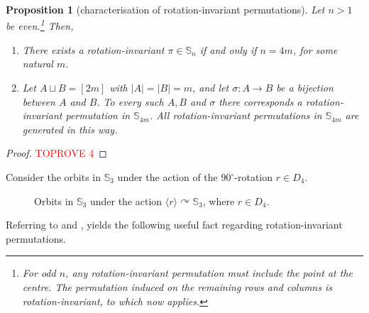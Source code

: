 \documentclass{article}
\newtheorem{proposition}[theorem]{Proposition}
\newcommand{\Sn}{\mathbb{S}_n}
\theoremstyle{remark}
\def\acts{\curvearrowright}
\theoremstyle{plain}
\begin{document}
\begin{proposition}[characterisation of rotation-invariant permutations]
    \label{prop:char_rotation_inv}
    Let $n>1$ be even.\footnote{For odd $n$, any rotation-invariant permutation \emph{must} include the point at the centre. The permutation induced on the remaining rows and columns is rotation-invariant, to which  now applies.} Then,
    \begin{enumerate}
        \item There exists a rotation-invariant $\pi \in \Sn$ if and only if $n=4m$, for some natural $m$. 
        \item Let $A \sqcup B = [2m]$ with $|A|=|B|=m$, and let $\sigma:A \to B$ be a bijection between $A$ and $B$. To every such $A, B$ and $\sigma$ there corresponds a rotation-invariant permutation in $\mathbb{S}_{4m}$. All rotation-invariant permutations in $\mathbb{S}_{4m}$ are generated in this way. 
    \end{enumerate}
\end{proposition}
\begin{proof}\textcolor{red}{TOPROVE 4}\end{proof}

Consider the orbits in $\mathbb{S}_3$ under the action of the $90^\circ$-rotation $r \in D_4$.

\begin{figure}[H]
    \centering
    \caption{Orbits in $\mathbb{S}_3$ under the action $\langle r \rangle \acts \mathbb{S}_3$, where $r \in D_4$.}
    \label{fig:action_D4_S3}
\end{figure}
Referring to  and , yields the following useful fact regarding rotation-invariant permutations.
\end{document}
